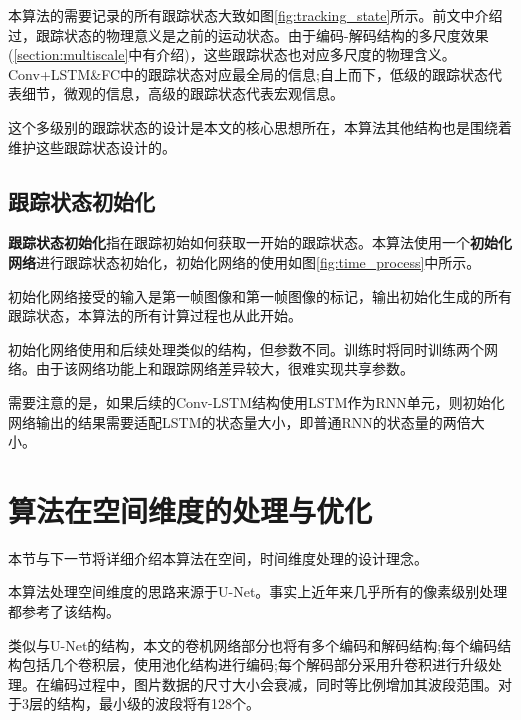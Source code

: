 \par
本算法的需要记录的所有跟踪状态大致如图\ref{fig:tracking_state}所示。前文中介绍过，跟踪状态的物理意义是之前的运动状态。由于编码-解码结构的多尺度效果(\ref{section:multiscale}中有介绍)，这些跟踪状态也对应多尺度的物理含义。Conv+LSTM\&FC中的跟踪状态对应最全局的信息;自上而下，低级的跟踪状态代表细节，微观的信息，高级的跟踪状态代表宏观信息。
\par
这个多级别的跟踪状态的设计是本文的核心思想所在，本算法其他结构也是围绕着维护这些跟踪状态设计的。

\subsection{跟踪状态初始化}
\textbf{跟踪状态初始化}指在跟踪初始如何获取一开始的跟踪状态。本算法使用一个\textbf{初始化网络}进行跟踪状态初始化，初始化网络的使用如图\ref{fig:time_process}中所示。
\par
初始化网络接受的输入是第一帧图像和第一帧图像的标记，输出初始化生成的所有跟踪状态，本算法的所有计算过程也从此开始。
\par
初始化网络使用和后续处理类似的结构，但参数不同。训练时将同时训练两个网络。由于该网络功能上和跟踪网络差异较大，很难实现共享参数。
\par
需要注意的是，如果后续的Conv-LSTM结构使用LSTM作为RNN单元，则初始化网络输出的结果需要适配LSTM的状态量大小，即普通RNN的状态量的两倍大小。

\section{算法在空间维度的处理与优化}
本节与下一节将详细介绍本算法在空间，时间维度处理的设计理念。
\par
本算法处理空间维度的思路来源于U-Net\supercite{ronneberger2015u}。事实上近年来几乎所有的像素级别处理都参考了该结构。
\par
类似与U-Net的结构，本文的卷机网络部分也将有多个编码和解码结构;每个编码结构包括几个卷积层，使用池化结构进行编码;每个解码部分采用升卷积进行升级处理。在编码过程中，图片数据的尺寸大小会衰减，同时等比例增加其波段范围。对于3层的结构，最小级的波段将有128个。

